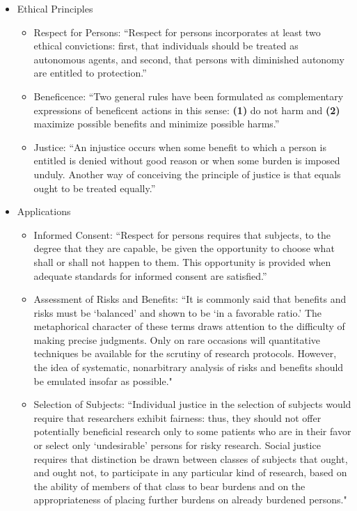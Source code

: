 \documentclass[12pt] {article}
\begin{document}
\begin{itemize}
\item
  Ethical Principles

  \begin{itemize}
  \item
    Respect for Persons: ``Respect for persons incorporates at least two
    ethical convictions: first, that individuals should be treated as
    autonomous agents, and second, that persons with diminished autonomy
    are entitled to protection.''
  \item
    Beneficence: ``Two general rules have been formulated as
    complementary expressions of beneficent actions in this sense:
    \textbf{(1)} do not harm and \textbf{(2)} maximize possible benefits
    and minimize possible harms.''
  \item
    Justice: ``An injustice occurs when some benefit to which a person
    is entitled is denied without good reason or when some burden is
    imposed unduly. Another way of conceiving the principle of justice
    is that equals ought to be treated equally.''
  \end{itemize}
\item
  Applications

  \begin{itemize}
  \item
    Informed Consent: ``Respect for persons requires that subjects, to
    the degree that they are capable, be given the opportunity to choose
    what shall or shall not happen to them. This opportunity is provided
    when adequate standards for informed consent are satisfied.''
  \item
    Assessment of Risks and Benefits: ``It is commonly said that
    benefits and risks must be `balanced' and shown to be `in a
    favorable ratio.' The metaphorical character of these terms draws
    attention to the difficulty of making precise judgments. Only on
    rare occasions will quantitative techniques be available for the
    scrutiny of research protocols. However, the idea of systematic,
    nonarbitrary analysis of risks and benefits should be emulated
    insofar as possible."
  \item
    Selection of Subjects: ``Individual justice in the selection of
    subjects would require that researchers exhibit fairness: thus, they
    should not offer potentially beneficial research only to some
    patients who are in their favor or select only `undesirable' persons
    for risky research. Social justice requires that distinction be
    drawn between classes of subjects that ought, and ought not, to
    participate in any particular kind of research, based on the ability
    of members of that class to bear burdens and on the appropriateness
    of placing further burdens on already burdened persons."
  \end{itemize}
\end{itemize}
\end{document}
